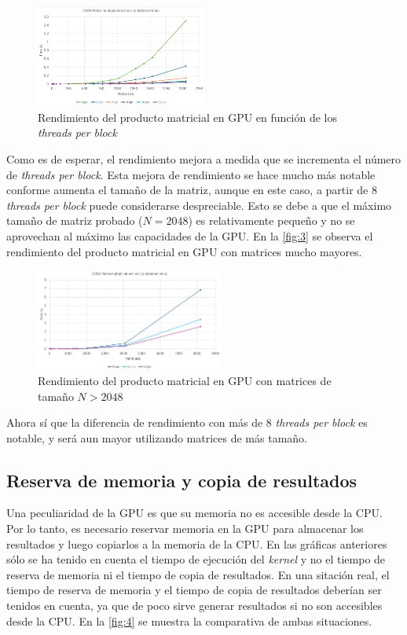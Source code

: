 \begin{figure}[h]
    \centering
    \includegraphics[width=0.5\textwidth]{img/2.png}
    \caption{Rendimiento del producto matricial en GPU en función de los \textit{threads per block}}
    \label{fig:2}
\end{figure}

Como es de esperar, el rendimiento mejora a medida que se incrementa el número de \textit{threads per block}. Esta mejora de rendimiento 
se hace mucho más notable conforme aumenta el tamaño de la matriz, aunque en este caso, a partir de $8$ \textit{threads per block} puede
considerarse despreciable. Esto se debe a que el máximo tamaño de matriz probado ($N=2048$) es relativamente pequeño y no se aprovechan
al máximo las capacidades de la GPU. En la \autoref{fig:3} se observa el rendimiento del producto matricial en GPU con matrices 
mucho mayores.

\begin{figure}[h]
    \centering
    \includegraphics[width=0.55\textwidth]{img/3.png}
    \caption{Rendimiento del producto matricial en GPU con matrices de tamaño $N>2048$}
    \label{fig:3}
\end{figure}

Ahora sí que la diferencia de rendimiento con más de $8$ \textit{threads per block} es notable, y será aun mayor utilizando matrices 
de más tamaño. 

\subsection{Reserva de memoria y copia de resultados}
Una peculiaridad de la GPU es que su memoria no es accesible desde la CPU. Por lo tanto,
es necesario reservar memoria en la GPU para almacenar los resultados y luego copiarlos a la memoria de la CPU. En las gráficas 
anteriores sólo se ha tenido en cuenta el tiempo de ejecución del \textit{kernel} y no el tiempo de reserva de memoria ni el
tiempo de copia de resultados. En una sitación real, el tiempo de reserva de memoria y el tiempo de copia de resultados
deberían ser tenidos en cuenta, ya que de poco sirve generar resultados si no son accesibles desde la CPU.
En la \autoref{fig:4} se muestra la comparativa de ambas situaciones.

